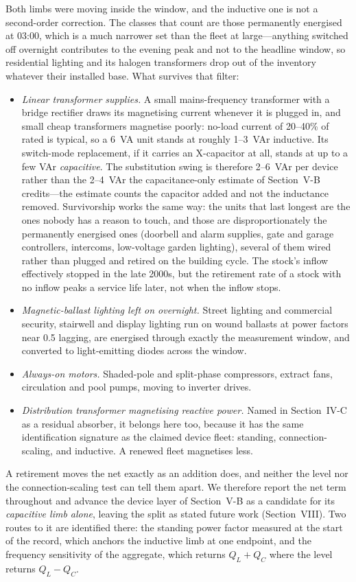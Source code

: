 \documentclass[journal]{IEEEtran}
\begin{document}
Both limbs were moving inside the window, and the inductive one is not a
second-order correction. The classes that count are those permanently energised
at 03:00, which is a much narrower set than the fleet at large---anything switched
off overnight contributes to the evening peak and not to the headline window, so
residential lighting and its halogen transformers drop out of the inventory
whatever their installed base. What survives that filter:
\begin{itemize}
\item \emph{Linear transformer supplies.} A small mains-frequency transformer with
  a bridge rectifier draws its magnetising current whenever it is plugged in, and
  small cheap transformers magnetise poorly: no-load current of 20--40\% of rated
  is typical, so a 6~VA unit stands at roughly 1--3~VAr inductive. Its
  switch-mode replacement, if it carries an X-capacitor at all, stands at up to a
  few VAr \emph{capacitive}. The substitution swing is therefore 2--6~VAr per
  device rather than the 2--4~VAr the capacitance-only estimate of Section~V-B
  credits---the estimate counts the capacitor added and not the inductance
  removed. Survivorship works the same way: the units that last longest are the
  ones nobody has a reason to touch, and those are disproportionately the
  permanently energised ones (doorbell and alarm supplies, gate and garage
  controllers, intercoms, low-voltage garden lighting), several of them wired
  rather than plugged and retired on the building cycle. The stock's inflow
  effectively stopped in the late 2000s, but the retirement rate of a stock with
  no inflow peaks a service life later, not when the inflow stops.
\item \emph{Magnetic-ballast lighting left on overnight.} Street lighting and
  commercial security, stairwell and display lighting run on wound ballasts at
  power factors near 0.5 lagging, are energised through exactly the measurement
  window, and converted to light-emitting diodes across the window.
\item \emph{Always-on motors.} Shaded-pole and split-phase compressors, extract
  fans, circulation and pool pumps, moving to inverter drives.
\item \emph{Distribution transformer magnetising reactive power.} Named in
  Section~IV-C as a residual absorber, it belongs here too, because it has the
  same identification signature as the claimed device fleet: standing,
  connection-scaling, and inductive. A renewed fleet magnetises less.
\end{itemize}
A retirement moves the net exactly as an addition does, and neither the level nor
the connection-scaling test can tell them apart. We therefore report the net term
throughout and advance the device layer of Section~V-B as a candidate for its
\emph{capacitive limb alone}, leaving the split as stated future work
(Section~VIII). Two routes to it are identified there: the standing power factor
measured at the start of the record, which anchors the inductive limb at one
endpoint, and the frequency sensitivity of the aggregate, which returns
$Q_L+Q_C$ where the level returns $Q_L-Q_C$.
\end{document}
